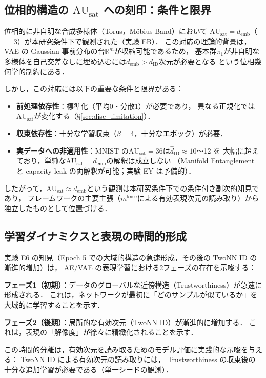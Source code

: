 \documentclass[11pt,a4paper]{jsarticle}
\newcommand{\dID}{d_{\mathrm{ID}}}
\newcommand{\R}{\mathbb{R}}
\newcommand{\AUsat}{\mathrm{AU}_{\mathrm{sat}}}
\newcommand{\mknee}{m^{\mathrm{knee}}}
\newcommand{\demb}{d_{\mathrm{emb}}}
\begin{document}
\subsection{位相的構造の $\AUsat$ への刻印：条件と限界}\label{sec:disc_topology}

位相的に非自明な合成多様体（Torus，Möbius Band）において
$\AUsat = \demb$（$= 3$）が本研究条件下で観測された（実験 EB）．
この対応の理論的背景は，VAE の Gaussian 事前分布の台$\R^m$が収縮可能であるため，
基本群$\pi_1$が非自明な多様体を自己交差なしに埋め込むには$\demb > \dID$次元が必要となる
という位相幾何学的制約\cite{hatcher2002algebraic,guillemin1974differential}にある．

しかし，この対応には以下の重要な条件と限界がある：
\begin{itemize}
  \item \textbf{前処理依存性}：標準化（平均0・分散1）が必要であり，
        異なる正規化では$\AUsat$が変化する（§\ref{sec:disc_limitation}）．
  \item \textbf{収束依存性}：十分な学習収束（$\beta = 4$，十分なエポック）が必要．
  \item \textbf{実データへの非適用性}：MNIST の$\AUsat = 36$は$\hat{d}_\mathrm{ID} \approx 10$〜12 を
        大幅に超えており，単純な$\AUsat = \demb$の解釈は成立しない
        （Manifold Entanglement と capacity leak の両解釈が可能；実験 EY は予備的）．
\end{itemize}

したがって，$\AUsat \approx \demb$という観測は本研究条件下での条件付き副次的知見であり，
フレームワークの主要主張（$\mknee$による有効表現次元の読み取り）から独立したものとして位置づける．

\subsection{学習ダイナミクスと表現の時間的形成}\label{sec:disc_dynamics}

実験 E6 の知見（Epoch 5 での大域的構造の急速形成，その後の TwoNN ID の漸進的増加）は，
AE/VAE の表現学習における2フェーズの存在を示唆する：

\textbf{フェーズ1（初期）}：データのグローバルな近傍構造（Trustworthiness）が急速に形成される．
これは，ネットワークが最初に「どのサンプルが似ているか」を大域的に学習することを示す．

\textbf{フェーズ2（後期）}：局所的な有効次元（TwoNN ID）が漸進的に増加する．
これは，表現の「解像度」が徐々に精緻化されることを示す．

この時間的分離は，有効次元を読み取るためのモデル評価に実践的な示唆を与える：
TwoNN ID による有効次元の読み取りには，
Trustworthiness の収束後の十分な追加学習が必要である（単一シードの観測）．
\end{document}
